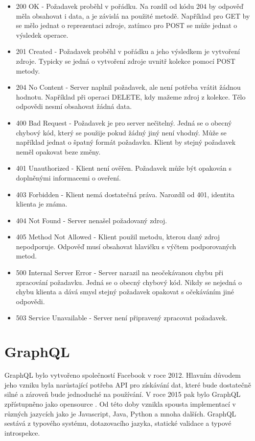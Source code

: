 \documentclass[thesis=M,czech]{FITthesis}[2019/12/23]
\begin{document}
\begin{itemize}
    \item 200 OK - Požadavek proběhl v pořádku. Na rozdíl od kódu 204 by odpověď měla obsahovat i data, a je závislá na použité metodě. Například pro GET by se mělo jednat o reprezentaci zdroje, zatímco pro POST se může jednat o výsledek operace. %
    \item 201 Created - Požadavek proběhl v pořádku a jeho výsledkem je vytvoření zdroje. Typicky se jedná o vytvoření zdroje uvnitř kolekce pomocí POST metody.
    \item 204 No Content - Server naplnil požadavek, ale není potřeba vrátit žádnou hodnotu. Například při operaci DELETE, kdy mažeme zdroj z kolekce. Tělo odpovědi nesmí obsahovat žádná data.
    \item 400 Bad Request - Požadavek je pro server nečitelný. Jedná se o obecný chybový kód, který se použije pokud žádný jiný není vhodný. Může se například jednat o špatný formát požadavku. Klient by stejný požadavek neměl opakovat beze změny.
    \item 401 Unauthorized - Klient není ověřen. Požadavek může být opakován s doplněnými informacemi o oveření.
    \item 403 Forbidden - Klient nemá dostatečná práva. Narozdíl od 401, identita klienta je známa.
    \item 404 Not Found - Server nenašel požadovaný zdroj.
    \item 405 Method Not Allowed - Klient použil metodu, kterou daný zdroj nepodporuje. Odpověď musí obsahovat hlavičku s výčtem podporovaných metod.
    \item 500 Internal Server Error - Server narazil na neočekávanou chybu při zpracování požadavku. Jedná se o obecný chybový kód. Nikdy se nejedná o chybu klienta a dává smysl stejný požadavek opakovat s očekáváním jiné odpovědi.
    \item 503 Service Unavailable - Server není připravený zpracovat požadavek.
\end{itemize}

\section{GraphQL}
GraphQL bylo vytvořeno společností Facebook v roce 2012. Hlavním důvodem jeho vzniku byla narůstající potřeba API pro získávání dat, které bude dostatečně silné a zároveň bude jednoduché na používání. V roce 2015 pak bylo GraphQL zpřístupněno jako opensource \cite{graphql_fb}. Od této doby vznikla spousta implementací v různých jazycích jako je Javascript, Java, Python a mnoha dalších. GraphQL sestává z typového systému, dotazovacího jazyka, statické validace a typové introspekce.
\end{document}
